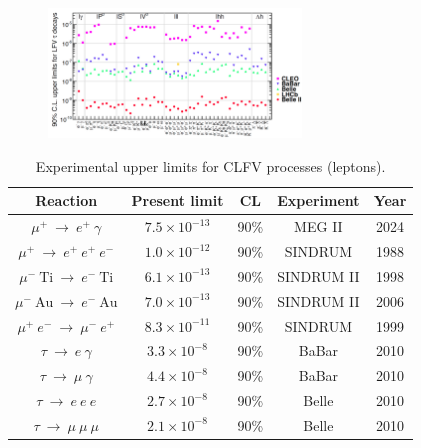 \documentclass{beamer}
\begin{document}
\begin{frame}
    \begin{figure}[!h]
      \centering
      \includegraphics[width =0.6\textwidth]{figures/png/Screenshot_20240319_134052.png}
      \label{fig:tauchannel}
      \end{figure}
  
\end{frame}


   


\begin{frame}
    \begin{center}  
        \begin{table}[!h]
        \centering
        \renewcommand{\arraystretch}{1}
        \begin{tabular}{c c c c c}
        \hline
        Reaction & Present limit & CL & Experiment &  Year \\
        \hline
        $\mu^+\ \rightarrow \ e^+ \ \gamma$& $7.5 \times 10^{-13}$ & 90\% & MEG II & 2024 \\
        $\mu^+ \ \rightarrow \ e^+ \ e^+ \ e^-$ & $1.0 \times 10^{-12}$ & 90\% & SINDRUM & 1988 \\
        $\mu^- \ \text{Ti}\ \rightarrow \ e^- \ \text{Ti}$ &  $6.1 \times 10^{-13}$ & 90\% & SINDRUM II & 1998\\
        $\mu^- \ \text{Au}\ \rightarrow \ e^- \ \text{Au}$ & $7.0 \times 10^{-13}$ & 90\% & SINDRUM II & 2006  \\
        $\mu^+ \ e^- \ \rightarrow \ \mu^- \ e^+$ & $8.3 \times 10^{-11}$ & 90\% & SINDRUM & 1999 \\
        $\tau \ \rightarrow \ e \ \gamma$ & $3.3 \times 10^{-8}$ & 90\% & BaBar & 2010 \\
        $\tau \ \rightarrow \ \mu \ \gamma$ & $4.4 \times 10^{-8}$ & 90\% & BaBar & 2010 \\
        $\tau \ \rightarrow \ e \ e \  e$ & $2.7 \times 10^{-8}$ & 90\% & Belle & 2010 \\
        $\tau \ \rightarrow \ \mu \ \mu  \ \mu$ & $2.1 \times 10^{-8}$ & 90\% & Belle & 2010  \\
        \hline
        \end{tabular}
        \caption{Experimental upper limits for CLFV processes (leptons).}
        \label{tab:upperlimits}
        \end{table}
    \end{center}
    \end{frame}
\end{document}

